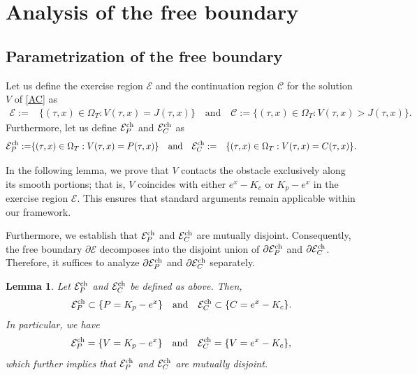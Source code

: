 \documentclass[11pt, a4paper, leqno]{amsart}
\numberwithin{equation}{section}
\theoremstyle{plain}
\newtheorem{lemma}[theorem]{Lemma}
\theoremstyle{definition}
\theoremstyle{remark}
\begin{document}
\section{Analysis of the free boundary }\label{sec:4}
\subsection{{ Parametrization} of the free boundary}

Let us define the exercise region $\mathcal{E}$ and the continuation region $\mathcal{C}$ for the solution $V$ of  \eqref{AC} as
    \begin{align*}
    \mathcal{E}:=& \{ (\tau,x)\in \Omega_T: V(\tau,x)=J(\tau,x) \}\quad\text{and}\quad
    \mathcal{C}:=\{ (\tau,x)\in \Omega_T: V(\tau,x)>J(\tau,x) \}.
\end{align*}
Furthermore, let us define $\mathcal{E}_P^{\rm ch}$ and $\mathcal{E}_C^{\rm ch}$ as
\begin{align*}
    \mathcal{E}_P^{\rm ch}:=&\{ (\tau,x)\in \Omega_T:V(\tau,x)=P(\tau,x) \}
    \quad\text{and}\quad
    \mathcal{E}_C^{\rm ch}:=&\{ (\tau,x)\in \Omega_T: V(\tau,x)=C(\tau,x) \}.
\end{align*}

In the following lemma, we prove that $V$ contacts the obstacle exclusively along its smooth portions; that is, $V$ coincides with either $e^x-K_c$ or $K_p-e^x$ in the exercise region $\mathcal{E}$. 
This ensures that standard arguments remain applicable within our framework.

Furthermore, we establish that $\mathcal{E}_P^{\rm ch}$ and $\mathcal{E}_C^{\rm ch}$ are mutually disjoint. 
Consequently, the free boundary $\partial\mathcal{E}$ decomposes into the disjoint union of $\partial\mathcal{E}_P^{\rm ch}$ and $\partial\mathcal{E}_C^{\rm ch}$. 
Therefore, it suffices to analyze $\partial\mathcal{E}_P^{\rm ch}$ and $\partial\mathcal{E}_C^{\rm ch}$ separately.

\begin{lemma}\label{FB1}
Let $\mathcal{E}_P^{\rm ch}$ and $\mathcal{E}_C^{\rm ch}$ be defined as above. Then,
\begin{equation}\label{FB11}
\mathcal{E}_P^{\rm ch}\subset \{P=K_p-e^x\}
\quad \text{and} \quad
\mathcal{E}_C^{\rm ch}\subset \{C=e^x-K_c\}.
\end{equation}
In particular, we have
\begin{equation}\label{FB12}
\mathcal{E}_P^{\rm ch}=\{V=K_p-e^x\}
\quad \text{and} \quad
\mathcal{E}_C^{\rm ch}=\{V=e^x-K_c\},
\end{equation}
which further implies that $\mathcal{E}_P^{\rm ch}$ and $\mathcal{E}_C^{\rm ch}$ are mutually disjoint.
\end{lemma}
\end{document}
